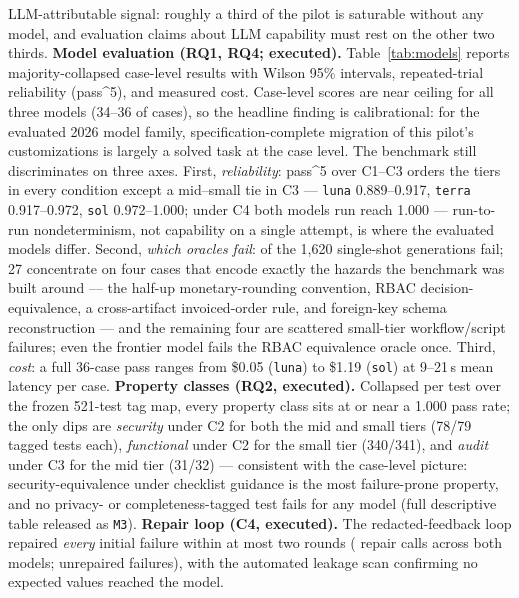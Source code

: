 \documentclass[journal]{IEEEtran}
\begin{document}
LLM-attributable signal: roughly a third of the pilot is saturable without any model, and
evaluation claims about LLM capability must rest on the other two thirds.
\textbf{Model evaluation (RQ1, RQ4; executed).} Table~\ref{tab:models} reports
majority-collapsed case-level results with Wilson 95\% intervals, repeated-trial reliability
(pass\textasciicircum{}5), and measured cost. Case-level scores are near ceiling for all
three models (34--36 of \NumCases{} cases), so the headline finding is calibrational: for
the evaluated 2026 model family, specification-complete migration of this pilot's
customizations is largely a solved task at the case level. The benchmark still discriminates on three axes.
First, \emph{reliability}: pass\textasciicircum{}5 over C1--C3 orders the tiers in every
condition except a mid--small tie in C3 --- \texttt{luna} 0.889--0.917, \texttt{terra}
0.917--0.972, \texttt{sol} 0.972--1.000; under C4 both models run reach 1.000 ---
run-to-run nondeterminism, not capability on a single attempt, is where the evaluated
models differ. Second, \emph{which oracles fail}: \PTwoFails{} of the 1{,}620 single-shot
generations fail; 27 concentrate on four cases that encode exactly the hazards the benchmark
was built around --- the half-up monetary-rounding convention, RBAC decision-equivalence, a
cross-artifact invoiced-order rule, and foreign-key schema reconstruction --- and the
remaining four are scattered small-tier workflow/script failures; even the frontier model
fails the RBAC equivalence oracle once. Third, \emph{cost}: a full 36-case pass ranges
from \$0.05 (\texttt{luna}) to \$1.19 (\texttt{sol}) at 9--21\,s mean latency per case.
\textbf{Property classes (RQ2, executed).} Collapsed per test over the frozen 521-test tag
map, every property class sits at or near a 1.000 pass rate; the only dips are
\emph{security} under C2 for both the mid and small tiers (78/79 tagged tests each),
\emph{functional} under C2 for the small tier (340/341), and \emph{audit} under C3 for the
mid tier (31/32) --- consistent with the case-level picture: security-equivalence under
checklist guidance is the most failure-prone property, and no privacy- or
completeness-tagged test fails for any model (full descriptive table released as
\texttt{M3}).
\textbf{Repair loop (C4, executed).} The redacted-feedback loop repaired \emph{every}
initial failure within at most two rounds (\RepairCalls{} repair calls across both models;
\RepairUnfixed{} unrepaired failures), with the automated leakage scan confirming no
expected values reached the model.
\end{document}
